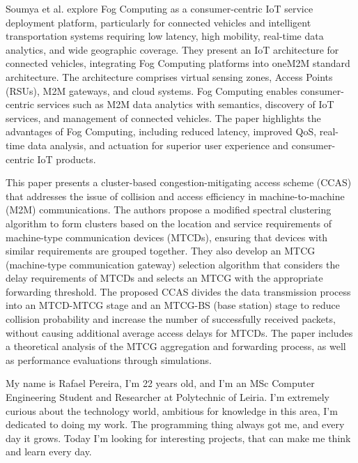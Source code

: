 \documentclass[a4paper,fleqn]{cas-dc}
\begin{document}
Soumya et al. \cite{Datta2015} explore Fog Computing as a consumer-centric IoT service deployment platform, particularly for connected vehicles and intelligent transportation systems requiring low latency, high mobility, real-time data analytics, and wide geographic coverage. They present an IoT architecture for connected vehicles, integrating Fog Computing platforms into oneM2M standard architecture. The architecture comprises virtual sensing zones, Access Points (RSUs), M2M gateways, and cloud systems. Fog Computing enables consumer-centric services such as M2M data analytics with semantics, discovery of IoT services, and management of connected vehicles. The paper highlights the advantages of Fog Computing, including reduced latency, improved QoS, real-time data analysis, and actuation for superior user experience and consumer-centric IoT products.

This paper \cite{Liang2018} presents a cluster-based congestion-mitigating access scheme (CCAS) that addresses the issue of collision and access efficiency in machine-to-machine (M2M) communications. The authors propose a modified spectral clustering algorithm to form clusters based on the location and service requirements of machine-type communication devices (MTCDs), ensuring that devices with similar requirements are grouped together. They also develop an MTCG (machine-type communication gateway) selection algorithm that considers the delay requirements of MTCDs and selects an MTCG with the appropriate forwarding threshold. The proposed CCAS divides the data transmission process into an MTCD-MTCG stage and an MTCG-BS (base station) stage to reduce collision probability and increase the number of successfully received packets, without causing additional average access delays for MTCDs. The paper includes a theoretical analysis of the MTCG aggregation and forwarding process, as well as performance evaluations through simulations.


\printcredits

%
%




My name is Rafael Pereira, I'm 22 years old, and I'm an MSc Computer Engineering Student and Researcher at Polytechnic of Leiria. I'm extremely curious about the technology world, ambitious for knowledge in this area, I'm dedicated to doing my work. The programming thing always got me, and every day it grows. Today I'm looking for interesting projects, that can make me think and learn every day.
\endbio
\end{document}
